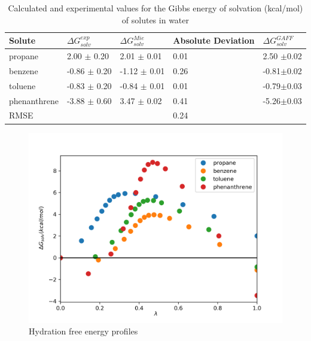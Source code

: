 \begin{table}[h]
\centering
  \caption{Calculated and experimental values for the Gibbs energy of solvation (kcal/mol) of solutes in water}
  \label{tbl:solv2}
  \begin{tabular}{lllll}
    \hline
     Solute      & $\Delta G_{solv}^{exp}$ & $\Delta G_{solv}^{Mie}$ & Absolute Deviation &$\Delta G_{solv}^{GAFF}$ \\
    \hline
    propane      &  2.00 $\pm$ 0.20 & 2.01 $\pm$ 0.01& 0.01 &2.50 $\pm$0.02 \\
    benzene      & -0.86 $\pm$ 0.20 & -1.12 $\pm$ 0.01    &  0.26    &-0.81$\pm$0.02 \\  
    toluene      & -0.83 $\pm$ 0.20 & -0.84 $\pm$ 0.01   &  0.01    &-0.79$\pm$0.03\\
    phenanthrene & -3.88 $\pm$ 0.60 & 3.47 $\pm$ 0.02& 0.41 &-5.26$\pm$0.03 \\
    \hline
    RMSE         &                  &               &  0.24     &      \\
    \hline
  \end{tabular}
\end{table}
\vspace{-2em}
\FloatBarrier
\begin{figure}
\centering
\includegraphics[width=0.9\linewidth]{Figures/water}
\caption{Hydration free energy profiles}
\label{fig:water}
\end{figure}
\FloatBarrier
